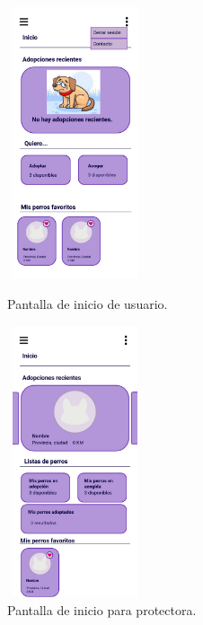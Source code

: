 \documentclass[a4paper, 12pt]{article}
\begin{document}
\begin{figure}[H]
   	\begin{minipage}{0.48\textwidth}
		\begin{center}
			{\includegraphics[height=8cm, width=4cm]{design/UserPage.jpg}\par}
			\caption{Pantalla de inicio de usuario.}
			\medskip
			\small

		\end{center}  
	\end{minipage}\hfill
   	\begin{minipage}{0.48\textwidth}
		\begin{center}
			{\includegraphics[height=8cm, width=4cm]{design/CompanyPage.jpg}\par}
			\caption{Pantalla de inicio para protectora.}
			\medskip			
		\end{center}  
	\end{minipage}\hfill
\end{figure}
\end{document}
